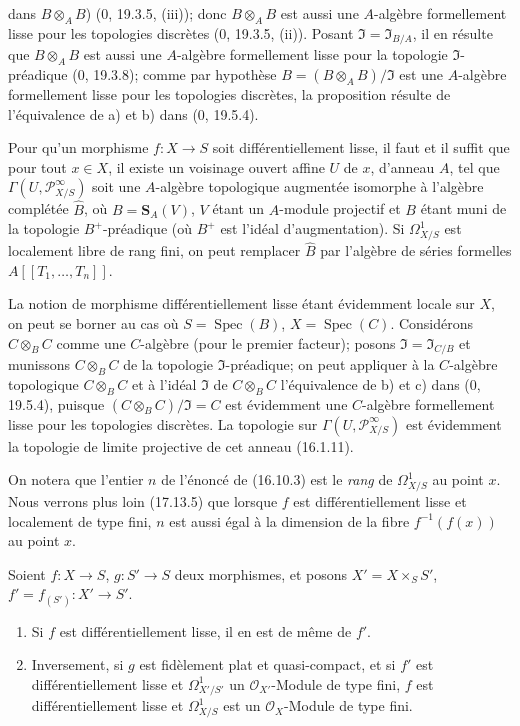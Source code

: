 dans $B\otimes_A B$) (0, 19.3.5, (iii)); donc $B\otimes_A B$ est aussi une
$A$-algèbre formellement lisse pour les topologies discrètes (0, 19.3.5,
(ii)). Posant $\mathfrak{I}=\mathfrak{I}_{B/A}$, il en résulte que
$B\otimes_A B$ est aussi une $A$-algèbre formellement lisse pour la topologie
$\mathfrak{I}$-préadique (0, 19.3.8); comme par hypothèse
$B=(B\otimes_A B)/\mathfrak{I}$ est une $A$-algèbre formellement lisse pour
les topologies discrètes, la proposition résulte de l'équivalence de a) et b)
dans (0, 19.5.4).

\begin{proposition}[16.10.3]
\label{IV.16.10.3}
Pour qu'un morphisme $f:X\to S$ soit différentiellement lisse, il faut et il
suffit que pour tout $x\in X$, il existe un voisinage ouvert affine $U$ de
$x$, d'anneau $A$, tel que $\Gamma(U,\mathscr{P}_{X/S}^{\infty})$ soit une
$A$-algèbre topologique augmentée isomorphe à l'algèbre complétée $\widehat B$,
où $B=\mathbf{S}_A(V)$, $V$ étant un $A$-module projectif et $B$ étant muni de
la topologie $B^+$-préadique (où $B^+$ est l'idéal d'augmentation). Si
$\Omega_{X/S}^1$ est localement libre de rang fini, on peut remplacer
$\widehat B$ par l'algèbre de séries formelles $A[[T_1,\ldots,T_n]]$.
\end{proposition}

La notion de morphisme différentiellement lisse étant évidemment locale sur
$X$, on peut se borner au cas où $S=\operatorname{Spec}(B)$,
$X=\operatorname{Spec}(C)$. Considérons $C\otimes_B C$ comme une $C$-algèbre
(pour le premier facteur); posons $\mathfrak{I}=\mathfrak{I}_{C/B}$ et
munissons $C\otimes_B C$ de la topologie $\mathfrak{I}$-préadique; on peut
appliquer à la $C$-algèbre topologique $C\otimes_B C$ et à l'idéal
$\mathfrak{I}$ de $C\otimes_B C$ l'équivalence de b) et c) dans (0, 19.5.4),
puisque $(C\otimes_B C)/\mathfrak{I}=C$ est évidemment une $C$-algèbre
formellement lisse pour les topologies discrètes. La topologie sur
$\Gamma(U,\mathscr{P}_{X/S}^{\infty})$ est évidemment la topologie de limite
projective de cet anneau (16.1.11).

On notera que l'entier $n$ de l'énoncé de (16.10.3) est le \emph{rang} de
$\Omega_{X/S}^1$ au point $x$. Nous verrons plus loin (17.13.5) que lorsque
$f$ est différentiellement lisse et localement de type fini, $n$ est aussi
égal à la dimension de la fibre $f^{-1}(f(x))$ au point $x$.

\begin{proposition}[16.10.4]
\label{IV.16.10.4}
Soient $f:X\to S$, $g:S'\to S$ deux morphismes, et posons
$X'=X\times_S S'$, $f'=f_{(S')}:X'\to S'$.
\begin{enumerate}
  \item[(i)] Si $f$ est différentiellement lisse, il en est de même de $f'$.
  \item[(ii)] Inversement, si $g$ est fidèlement plat et quasi-compact, et si
  $f'$ est différentiellement lisse et $\Omega_{X'/S'}^1$ un
  $\mathcal{O}_{X'}$-Module de type fini, $f$ est différentiellement lisse et
  $\Omega_{X/S}^1$ est un $\mathcal{O}_X$-Module de type fini.
\end{enumerate}
\end{proposition}

